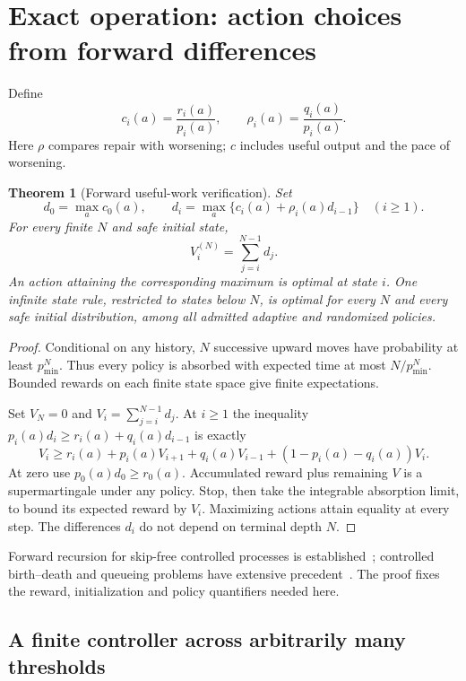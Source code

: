 \documentclass[10pt,a4paper]{article}
\newtheorem{theorem}{Theorem}\newtheorem{proposition}{Proposition}
\begin{document}
\section{Exact operation: action choices from forward differences}

Define
\[
c_i(a)=\frac{r_i(a)}{p_i(a)},\qquad \rho_i(a)=\frac{q_i(a)}{p_i(a)}.
\]
Here $\rho$ compares repair with worsening; $c$ includes useful output and the pace of worsening.

\begin{theorem}[Forward useful-work verification]
Set
\begin{equation}
d_0=\max_a c_0(a),\qquad
d_i=\max_a\{c_i(a)+\rho_i(a)d_{i-1}\}\quad(i\ge1).
\label{eq:recursion}
\end{equation}
For every finite $N$ and safe initial state,
\begin{equation}
\boxed{V_i^{(N)}=\sum_{j=i}^{N-1}d_j.}
\label{eq:value}
\end{equation}
An action attaining the corresponding maximum is optimal at state $i$. One infinite state rule, restricted to states below $N$, is optimal for every $N$ and every safe initial distribution, among all admitted adaptive and randomized policies.
\end{theorem}

\begin{proof}
Conditional on any history, $N$ successive upward moves have probability at least $p_{\min}^N$. Thus every policy is absorbed with expected time at most $N/p_{\min}^N$. Bounded rewards on each finite state space give finite expectations.

Set $V_N=0$ and $V_i=\sum_{j=i}^{N-1}d_j$. At $i\ge1$ the inequality
$p_i(a)d_i\ge r_i(a)+q_i(a)d_{i-1}$ is exactly
\[
V_i\ge r_i(a)+p_i(a)V_{i+1}+q_i(a)V_{i-1}
+(1-p_i(a)-q_i(a))V_i.
\]
At zero use $p_0(a)d_0\ge r_0(a)$. Accumulated reward plus remaining $V$ is a supermartingale under any policy. Stop, then take the integrable absorption limit, to bound its expected reward by $V_i$. Maximizing actions attain equality at every step. The differences $d_i$ do not depend on terminal depth $N$.
\end{proof}

Forward recursion for skip-free controlled processes is established~\cite{wijngaard}; controlled birth--death and queueing problems have extensive precedent~\cite{serfozo}. The proof fixes the reward, initialization and policy quantifiers needed here.

\subsection{A finite controller across arbitrarily many thresholds}
\end{document}
